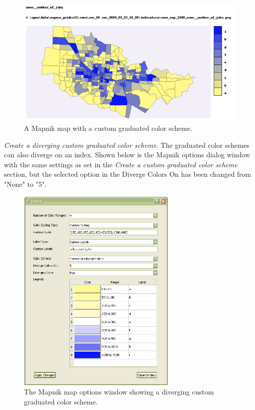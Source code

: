 \begin{figure}[hbp]
\begin{center}
\includegraphics[width=\textwidth]{part-gui/images/sample-map-custom-settings-2.png}
\end{center}
\caption{A Mapnik map with a custom graduated color scheme.}
\label{fig:sample-map-custom-settings-2}
\end{figure}
\clearpage

\emph{Create a diverging custom graduated color scheme}. The graduated color 
schemes can also diverge on an index. Shown below is the Mapnik options 
dialog window with the same settings as set in the 
\emph{Create a custom graduated color scheme} section, 
but the selected option in the Diverge Colors On has been changed 
from "None" to "5".

\begin{figure}[hb]
\begin{center}
\includegraphics[width=3in]{part-gui/images/result-manager-mapnik-options-example-3.png}
\end{center}
\caption{The Mapnik map options window showing a diverging custom graduated color scheme.}
\label{fig:result-manager-mapnik-options-example-3}
\end{figure}
\clearpage

